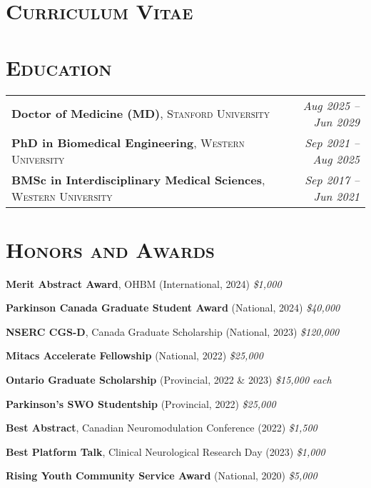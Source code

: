 \section*{\textsc{Curriculum Vitae}}

\section*{\textsc{Education}} \noindent\hrulefill \vspace{0.5em}
\begin{tabularx}{\textwidth}{@{}X r@{}}
\textbf{Doctor of Medicine (MD)}, \textsc{Stanford University} & \textit{Aug 2025 – Jun 2029} \\
\textbf{PhD in Biomedical Engineering}, \textsc{Western University} & \textit{Sep 2021 – Aug 2025} \\
\textbf{BMSc in Interdisciplinary Medical Sciences}, \textsc{Western University} & \textit{Sep 2017 – Jun 2021} \\
\end{tabularx}

\vspace{0.5em}
\section*{\textsc{Honors and Awards}} \noindent\hrulefill \vspace{0.5em}
  \item \textbf{Merit Abstract Award}, OHBM (International, 2024) \hfill \textit{\$1,000}
  \item \textbf{Parkinson Canada Graduate Student Award} (National, 2024) \hfill \textit{\$40,000}
  \item \textbf{NSERC CGS-D}, Canada Graduate Scholarship (National, 2023) \hfill \textit{\$120,000}
  \item \textbf{Mitacs Accelerate Fellowship} (National, 2022) \hfill \textit{\$25,000}
  \item \textbf{Ontario Graduate Scholarship} (Provincial, 2022 \& 2023) \hfill \textit{\$15,000 each}
  \item \textbf{Parkinson’s SWO Studentship} (Provincial, 2022) \hfill \textit{\$25,000}
  \item \textbf{Best Abstract}, Canadian Neuromodulation Conference (2022) \hfill \textit{\$1,500}
  \item \textbf{Best Platform Talk}, Clinical Neurological Research Day (2023) \hfill \textit{\$1,000}
  \item \textbf{Rising Youth Community Service Award} (National, 2020) \hfill \textit{\$5,000}

